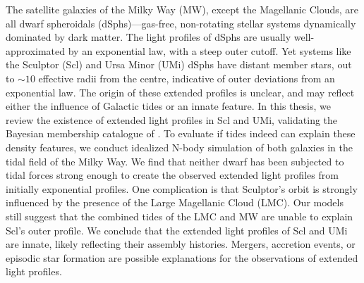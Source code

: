 The satellite galaxies of the Milky Way (MW), except the Magellanic
Clouds, are all dwarf spheroidals (dSphs)---gas-free, non-rotating
stellar systems dynamically dominated by dark matter. The light profiles
of dSphs are usually well-approximated by an exponential law, with a
steep outer cutoff. Yet systems like the Sculptor (Scl) and Ursa Minor
(UMi) dSphs have distant member stars, out to \(\sim10\) effective radii
from the centre, indicative of outer deviations from an exponential law.
The origin of these extended profiles is unclear, and may reflect either
the influence of Galactic tides or an innate feature. In this thesis, we
review the existence of extended light profiles in Scl and UMi,
validating the Bayesian membership catalogue of \citet{jensen+2024}. To
evaluate if tides indeed can explain these density features, we conduct
idealized N-body simulation of both galaxies in the tidal field of the
Milky Way. We find that neither dwarf has been subjected to tidal forces
strong enough to create the observed extended light profiles from
initially exponential profiles. One complication is that Sculptor's
orbit is strongly influenced by the presence of the Large Magellanic
Cloud (LMC). Our models still suggest that the combined tides of the LMC
and MW are unable to explain Scl's outer profile. We conclude that the
extended light profiles of Scl and UMi are innate, likely reflecting
their assembly histories. Mergers, accretion events, or episodic star
formation are possible explanations for the observations of extended
light profiles.
